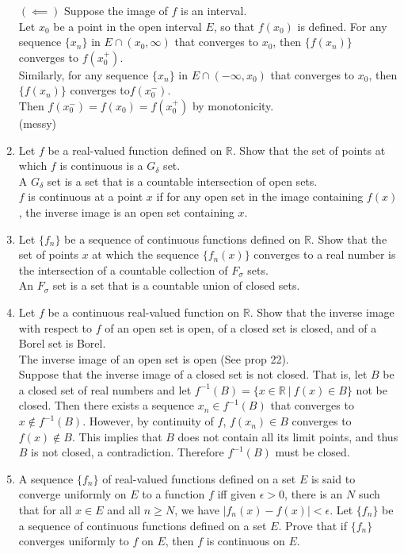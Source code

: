 \begin{enumerate}
	$(\impliedby)$ Suppose the image of $f$ is an interval.\\
	Let $x_0$ be a point in the open interval $E$, so that $f(x_0)$ is defined. 
	For any sequence $\{x_n\}$ in $E\cap(x_0,\infty)$ that converges to $x_0$, then $\{f(x_n)\}$ converges to $f(x_0^+)$.\\
	Similarly, for any sequence $\{x_n\}$ in $E\cap(-\infty,x_0)$ that converges to $x_0$, then $\{f(x_n)\}$ converges to$f(x_0^-)$.\\
	Then $f(x_0^-)=f(x_0)= f(x_0^+)$ by monotonicity.
	\\(messy)
	\item Let $f$ be a real-valued function defined on $\mathbb{R}$. Show that the set of points at which $f$ is continuous is a $G_\delta$ set.\\
	A $G_\delta$ set is a set that is a countable intersection of open sets.\\
	$f$ is continuous at a point $x$ if for any open set in the image containing $f(x)$, the inverse image is an open set containing $x$.
	\item Let $\{ f_n\}$ be a sequence of continuous functions defined on $\mathbb{R}$. Show that the set of points $x$ at which the sequence $\{f_n(x)\}$ converges to a real number is the intersection of a countable collection of $F_\sigma$ sets.\\
	An $F_\sigma$ set is a set that is a countable union of closed sets.
	\item Let $f$ be a continuous real-valued function on $\mathbb{R}$. Show that the inverse image with respect to $f$ of an open set is open, of a closed set is closed, and of a Borel set is Borel.\\
	The inverse image of an open set is open (See prop 22).\\
	Suppose that the inverse image of a closed set is not closed.
	That is, let $B$ be a closed set of real numbers and let $f^{-1}(B)=\{x\in\mathbb{R}\ |\ f(x)\in B\}$ not be closed. 
	Then there exists a sequence $x_n\in f^{-1}(B)$ that converges to $x \notin f^{-1}(B)$.
	However, by continuity of $f$, $f(x_n)\in B$ converges to $f(x)\notin B$.
	This implies that $B$ does not contain all its limit points, and thus $B$ is not closed, a contradiction.
	Therefore $f^{-1}(B)$ must be closed.
	\item A sequence $\{f_n\}$ of real-valued functions defined on a set $E$ is said to converge uniformly on $E$ to a function $f$ iff given $\epsilon >0$, there is an $N$ such that for all $x \in E$ and all $n \ge N$, we have $|f_n(x) - f(x)| < \epsilon$. Let $\{f_n\}$ be a sequence of continuous functions defined on a set $E$. Prove that if $\{f_n\}$ converges uniformly to $f$ on $E$, then $f$ is continuous on $E$.\\

\end{enumerate}
